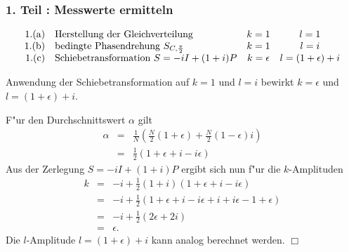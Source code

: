          \subsubsection*{1. Teil : Messwerte ermitteln}
           $$ 
           \begin{array}{rlcc}
             \mbox{1.(a)} & \mbox{Herstellung der Gleichverteilung }            & k=1         & l=1 \cr
             \mbox{1.(b)} & \mbox{bedingte Phasendrehung } S_{C,\frac{\pi}{2}}  & k=1         & l=i \cr
             \mbox{1.(c)} & \mbox{Schiebetransformation } S=-iI+(1+i)P          & k=\epsilon  & l=(1+\epsilon)+i
           \end{array}
           $$
           \begin{lemma}
             Anwendung der Schiebetransformation auf $k=1$ und $l=i$ bewirkt $k=\epsilon$ und $l=(1+\epsilon)+i$.
           \end{lemma}
           \beweis F"ur den Durchschnittswert $\alpha$ gilt
             \begin{eqnarray*}
               \alpha & = & \frac{1}{N}\left( \frac{N}{2}\left(1+\epsilon\right)+\frac{N}{2}\left(1-\epsilon\right)i\right) \\
                      & = & \frac{1}{2}\left(1 + \epsilon + i - i\epsilon\right)
             \end{eqnarray*}
             Aus der Zerlegung $S=-iI+(1+i)P$ ergibt sich nun f"ur die $k$-Amplituden
             \begin{eqnarray*}
               k & = & -i + \frac{1}{2}\left(1+i\right)\left(1+\epsilon + i - i\epsilon \right) \\
                 & = & -i + \frac{1}{2}\left(1+ \epsilon + i - i\epsilon + i + i\epsilon - 1 + \epsilon\right) \\
                 & = & -i + \frac{1}{2}\left(2\epsilon + 2i\right) \\
                 & = & \epsilon .
             \end{eqnarray*}
             Die $l$-Amplitude $l = \left(1+\epsilon\right) + i$ kann analog berechnet werden. \hfill $\Box$
           
